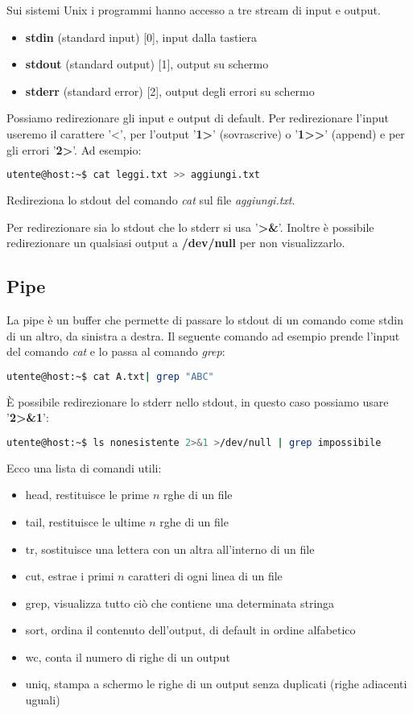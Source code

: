 \documentclass[../main.tex]{subfiles}
\begin{document}
Sui sistemi Unix i programmi hanno accesso a tre stream di input e output.
\begin{itemize}
    \item \textbf{stdin} (standard input) [0], input dalla tastiera
    \item \textbf{stdout} (standard output) [1], output su schermo
    \item \textbf{stderr} (standard error) [2], output degli errori su schermo
\end{itemize}

Possiamo redirezionare gli input e output di default. Per redirezionare l'input useremo il carattere '<', per l'output '\textbf{1>}' (sovrascrive)
o '\textbf{1>\phantom{}>}' (append) e per gli errori '\textbf{2>}'. Ad esempio:

\begin{lstlisting}[language=bash, frame=l]
    utente@host:~$ cat leggi.txt >> aggiungi.txt
\end{lstlisting}
Redireziona lo stdout del comando \textit{cat} sul file \textit{aggiungi.txt}.

Per redirezionare sia lo stdout che lo stderr si usa '\textbf{>\&}'. Inoltre è possibile redirezionare un qualsiasi output a \textbf{/dev/null} per non visualizzarlo.

\subsection{Pipe}
La pipe è un buffer che permette di passare lo stdout di un comando come stdin di un altro, da sinistra a destra. Il seguente comando 
ad esempio prende l'input del comando \textit{cat} e lo passa al comando \textit{grep}:
\begin{lstlisting}[language=bash, frame=l]
    utente@host:~$ cat A.txt| grep "ABC"
\end{lstlisting}

È possibile redirezionare lo stderr nello stdout, in questo caso possiamo usare '\textbf{2>\&1}':
\begin{lstlisting}[language=bash, frame=l]
    utente@host:~$ ls nonesistente 2>&1 >/dev/null | grep impossibile
\end{lstlisting}

Ecco una lista di comandi utili:
\begin{itemize}
    \item head, restituisce le prime $n$ rghe di un file
    \item tail, restituisce le ultime $n$ rghe di un file
    \item tr, sostituisce una lettera con un altra all'interno di un file
    \item cut, estrae i primi $n$ caratteri di ogni linea di un file
    \item grep, visualizza tutto ciò che contiene una determinata stringa
    \item sort, ordina il contenuto dell'output, di default in ordine alfabetico
    \item wc, conta il numero di righe di un output
    \item uniq, stampa a schermo le righe di un output senza duplicati (righe adiacenti uguali)
\end{itemize}
\end{document}
